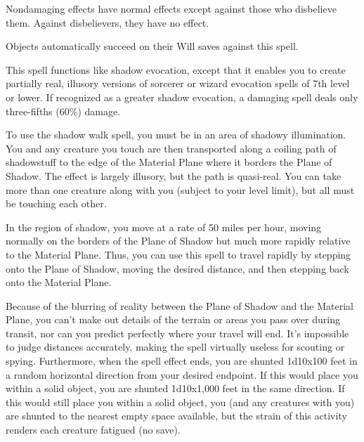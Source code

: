 \begin{multicols}{2}
\begin{small}
\smallskip\noindent Nondamaging effects have normal effects except against those who disbelieve them. Against disbelievers, they have no effect.

\smallskip\noindent Objects automatically succeed on their Will saves against this spell.

\noindent This spell functions like shadow evocation, except that it enables you to create partially real, illusory versions of sorcerer or wizard evocation spells of 7th level or lower. If recognized as a greater shadow evocation, a damaging spell deals only three-fifths (60\%) damage.

\noindent To use the shadow walk spell, you must be in an area of shadowy illumination. You and any creature you touch are then transported along a coiling path of shadowstuff to the edge of the Material Plane where it borders the Plane of Shadow. The effect is largely illusory, but the path is quasi-real. You can take more than one creature along with you (subject to your level limit), but all must be touching each other.

\smallskip\noindent In the region of shadow, you move at a rate of 50 miles per hour, moving normally on the borders of the Plane of Shadow but much more rapidly relative to the Material Plane. Thus, you can use this spell to travel rapidly by stepping onto the Plane of Shadow, moving the desired distance, and then stepping back onto the Material Plane.

\smallskip\noindent Because of the blurring of reality between the Plane of Shadow and the Material Plane, you can't make out details of the terrain or areas you pass over during transit, nor can you predict perfectly where your travel will end. It's impossible to judge distances accurately, making the spell virtually useless for scouting or spying. Furthermore, when the spell effect ends, you are shunted 1d10x100 feet in a random horizontal direction from your desired endpoint. If this would place you within a solid object, you are shunted 1d10x1,000 feet in the same direction. If this would still place you within a solid object, you (and any creatures with you) are shunted to the nearest empty space available, but the strain of this activity renders each creature fatigued (no save).


\end{small}
\end{multicols}
